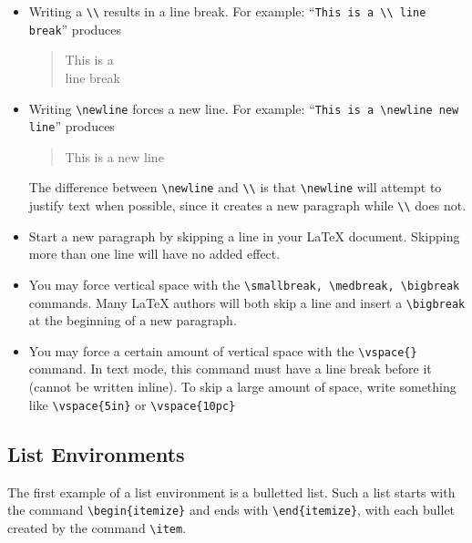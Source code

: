 \documentclass[letterpaper,twoside,10pt]{article}
\begin{document}
\begin{itemize}
 \item Writing a \verb!\\! results in a line break. For example: ``\verb!This is a \\ line break!'' produces
\begin{quote}
 This is a \\ line break
\end{quote}

 \item Writing \verb!\newline! forces a new line. For example: ``\verb!This is a \newline new line!'' produces
\begin{quote}
 This is a \newline new line
\end{quote}
The difference between \verb!\newline! and \verb!\\! is that \verb!\newline! will attempt to justify text when possible, since it creates a new paragraph while \verb!\\! does not.

\item Start a new paragraph by skipping a line in your {\LaTeX} document. Skipping more than one line will have no added effect.

\item You may force vertical space with the \verb!\smallbreak, \medbreak, \bigbreak! commands. Many {\LaTeX} authors will both skip a line and insert a \verb!\bigbreak! at the beginning of a new paragraph.

\item You may force a certain amount of vertical space with the \verb!\vspace{}! command. In text mode, this command must have a line break before it (cannot be written inline). To skip a large amount of space, write something like \verb!\vspace{5in}! or \verb!\vspace{10pc}! 
\end{itemize}

\subsection{List Environments}

The first example of a list environment is a bulletted list. Such a list starts with the command \verb!\begin{itemize}! and ends with \verb!\end{itemize}!, with each bullet created by the command \verb!\item!.
\end{document}
